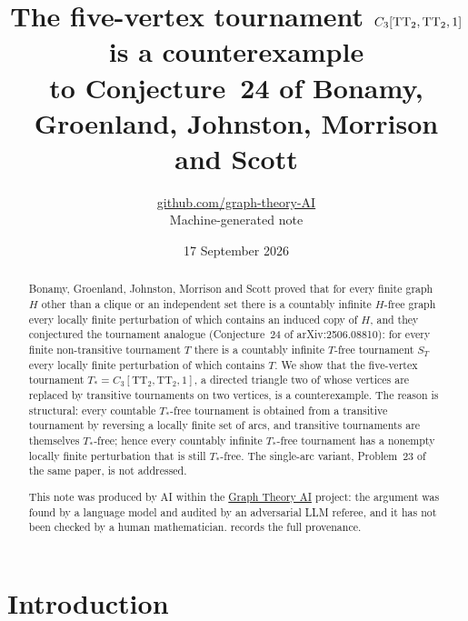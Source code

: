 \documentclass[11pt,a4paper]{article}
\title{The five-vertex tournament $C_3[\TT_2,\TT_2,1]$ is a counterexample\\ to Conjecture~24 of Bonamy, Groenland, Johnston, Morrison and Scott}
\author{\href{https://github.com/graph-theory-AI}{github.com/graph-theory-AI}\\[2pt] \normalsize Machine-generated note}
\date{17 September 2026}
\theoremstyle{plain}
\theoremstyle{definition}
\theoremstyle{remark}
\newcommand{\Tstar}{T_{\ast}}
\newcommand{\TT}{\mathrm{TT}}
\begin{document}
\maketitle

\begin{abstract}
Bonamy, Groenland, Johnston, Morrison and Scott proved that for every finite graph $H$ other than a clique or an independent set there is a countably infinite $H$-free graph every locally finite perturbation of which contains an induced copy of $H$, and they conjectured the tournament analogue (Conjecture~24 of arXiv:2506.08810): for every finite non-transitive tournament $T$ there is a countably infinite $T$-free tournament $S_T$ every locally finite perturbation of which contains $T$. We show that the five-vertex tournament $\Tstar=C_3[\TT_2,\TT_2,1]$, a directed triangle two of whose vertices are replaced by transitive tournaments on two vertices, is a counterexample. The reason is structural: every countable $\Tstar$-free tournament is obtained from a transitive tournament by reversing a locally finite set of arcs, and transitive tournaments are themselves $\Tstar$-free; hence every countably infinite $\Tstar$-free tournament has a nonempty locally finite perturbation that is still $\Tstar$-free. The single-arc variant, Problem~23 of the same paper, is not addressed.

\medskip\noindent\small
This note was produced by AI within the \href{https://github.com/graph-theory-AI/Graph-Theory-LLM-Proofs}{Graph Theory AI} project:
the argument was found by a language model and audited by an adversarial LLM
referee, and it has not been checked by a human mathematician.
 records the full provenance.
\end{abstract}

\section{Introduction}
\end{document}
